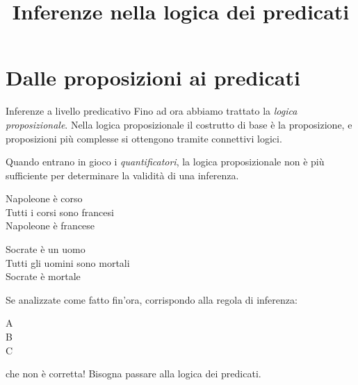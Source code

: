 \documentclass[aspectratio=169,10pt,dvipsnames,xcolor=table]{beamer}
\title{Inferenze nella logica dei predicati}
\begin{document}
\begin{frame}
    \titlepage
\end{frame}

\section{Dalle proposizioni ai predicati}

\begin{frame}{Inferenze a livello predicativo}
    Fino ad ora abbiamo trattato la \emph{logica proposizionale}. Nella logica proposizionale il costrutto di base è la proposizione, e proposizioni più complesse si ottengono tramite connettivi logici.

    \medskip
    Quando entrano in gioco i \emph{quantificatori}, la logica proposizionale non è più sufficiente per determinare la validità di una inferenza.

    \begin{center}
        \begin{inference}
            Napoleone è corso\\
            Tutti i corsi sono francesi\\
            \hline
            Napoleone è francese
        \end{inference}
        \qquad
        \begin{inference}
            Socrate è un uomo\\
            Tutti gli uomini sono mortali\\
            \hline
            Socrate è mortale
        \end{inference}
    \end{center}
    Se analizzate come fatto fin'ora, corrispondo alla regola di inferenza:
    \begin{center}
        \begin{inference}
            A\\
            B\\
            \hline
            C
        \end{inference}
    \end{center}
    che non è corretta! Bisogna passare alla \alert{logica dei predicati}.
\end{frame}
\end{document}
